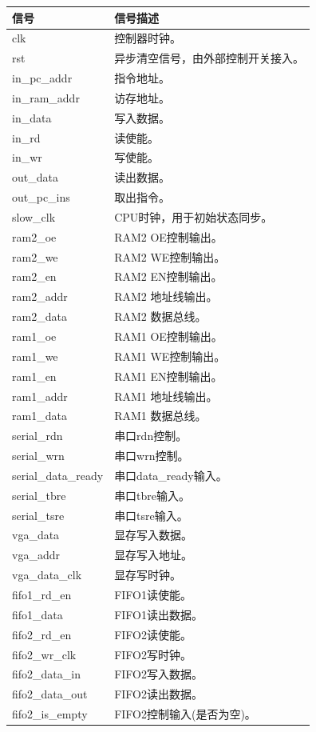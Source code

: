 \begin{center}
    \label{table:memory_ctl}
    \begin{longtable}{p{}p{}}
        \toprule
        信号 & 信号描述 \\
        \midrule
        clk & 控制器时钟。 \\
        rst & 异步清空信号，由外部控制开关接入。 \\
        in\_pc\_addr & 指令地址。 \\
        in\_ram\_addr & 访存地址。 \\
        in\_data & 写入数据。 \\
        in\_rd & 读使能。 \\
        in\_wr & 写使能。 \\
        out\_data & 读出数据。 \\
        out\_pc\_ins & 取出指令。 \\
        slow\_clk & CPU时钟，用于初始状态同步。 \\
        ram2\_oe & RAM2 OE控制输出。 \\
        ram2\_we & RAM2 WE控制输出。 \\
        ram2\_en & RAM2 EN控制输出。 \\
        ram2\_addr & RAM2 地址线输出。 \\
        ram2\_data & RAM2 数据总线。 \\
        ram1\_oe & RAM1 OE控制输出。 \\
        ram1\_we & RAM1 WE控制输出。 \\
        ram1\_en & RAM1 EN控制输出。 \\
        ram1\_addr & RAM1 地址线输出。 \\
        ram1\_data & RAM1 数据总线。 \\
        serial\_rdn & 串口rdn控制。 \\
        serial\_wrn & 串口wrn控制。 \\
        serial\_data\_ready & 串口data\_ready输入。 \\
        serial\_tbre & 串口tbre输入。 \\
        serial\_tsre & 串口tsre输入。 \\
        vga\_data & 显存写入数据。 \\
        vga\_addr & 显存写入地址。 \\
        vga\_data\_clk & 显存写时钟。 \\
        fifo1\_rd\_en & FIFO1读使能。 \\
        fifo1\_data & FIFO1读出数据。 \\
        fifo2\_rd\_en & FIFO2读使能。 \\
        fifo2\_wr\_clk & FIFO2写时钟。 \\
        fifo2\_data\_in & FIFO2写入数据。 \\
        fifo2\_data\_out & FIFO2读出数据。 \\
        fifo2\_is\_empty & FIFO2控制输入(是否为空)。 \\
        \bottomrule
    \end{longtable}
\end{center}
